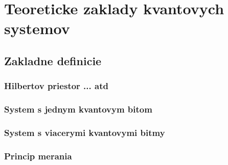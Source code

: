
\chapter{Teoreticke zaklady kvantovych systemov}

\section{Zakladne definicie}

\subsection{Hilbertov priestor ... atd}
\subsection{System s jednym kvantovym bitom}
\subsection{System s viacerymi kvantovymi bitmy}
\subsection{Princip merania}

